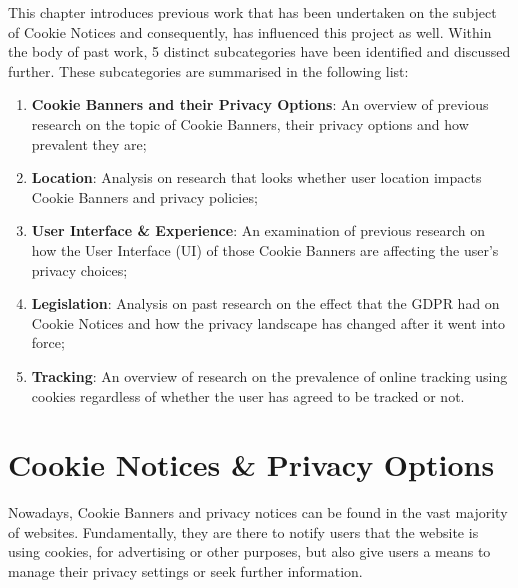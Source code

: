 \documentclass[../main.tex]{subfiles}
\begin{document}
This chapter introduces previous work that has been undertaken on the subject of Cookie Notices and consequently, has influenced this project as well. Within the body of past work, 5 distinct subcategories have been identified and discussed further. These subcategories are summarised in the following list:

\begin{enumerate}
    \item \textbf{Cookie Banners and their Privacy Options}: An overview of previous research on the topic of Cookie Banners, their privacy options and how prevalent they are;
    \item \textbf{Location}: Analysis on research that looks whether user location impacts Cookie Banners and privacy policies;
    \item \textbf{User Interface \& Experience}: An examination of previous research on how the User Interface (UI) of those Cookie Banners are affecting the user’s privacy choices;
    \item \textbf{Legislation}: Analysis on past research on the effect that the GDPR had on Cookie Notices and how the privacy landscape has changed after it went into force;
    \item \textbf{Tracking}: An overview of research on the prevalence of online tracking using cookies regardless of whether the user has agreed to be tracked or not. 
\end{enumerate}

\section{Cookie Notices \& Privacy Options}
Nowadays, Cookie Banners and privacy notices can be found in the vast majority of websites. Fundamentally, they are there to notify users that the website is using cookies, for advertising or other purposes, but also give users a means to manage their privacy settings or seek further information. 
\end{document}
